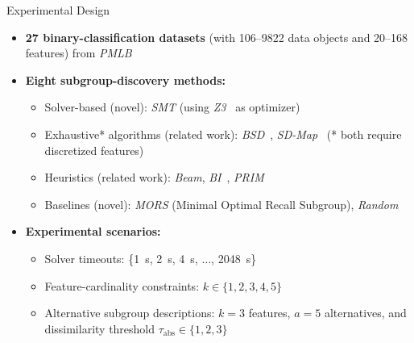 \documentclass[en, navbaroff, handout]{sdqbeamer}
\begin{document}
\begin{frame}[t]{Experimental Design}
	\begin{itemize}
		\item \textbf{27 binary-classification datasets} (with 106--9822 data objects and 20--168 features) from \emph{PMLB}~\cite{olson2017pmlb, romano2021pmlb}
		\pause
		\vspace{\baselineskip}
		\item \textbf{Eight subgroup-discovery methods:}
		\begin{itemize}
			\item Solver-based (novel): \emph{SMT} (using \emph{Z3}~\cite{bjorner2015nuz, deMoura2008z3} as optimizer)
			\item Exhaustive* algorithms (related work): \emph{BSD}~\cite{lemmerich2010fast}, \emph{SD-Map}~\cite{atzmueller2006sd} (* both require discretized features)
			\item Heuristics (related work): \emph{Beam}, \emph{BI}~\cite{mampaey2012efficient}, \emph{PRIM}~\cite{friedman1999bump}
			\item Baselines (novel): \emph{MORS} (Minimal Optimal Recall Subgroup), \emph{Random}
		\end{itemize}
		\pause
		\vspace{\baselineskip}
		\item \textbf{Experimental scenarios:}
		\begin{itemize}
			\item Solver timeouts: \{1~s, 2~s, 4~s, $\dots$, 2048~s\}
			\item Feature-cardinality constraints: $k \in \{1, 2, 3, 4, 5\}$
			\item Alternative subgroup descriptions: $k=3$ features, $a=5$ alternatives, and dissimilarity threshold $\tau_{\text{abs}} \in \{1, 2, 3\}$

\end{itemize}
\end{itemize}
\end{frame}
\end{document}
